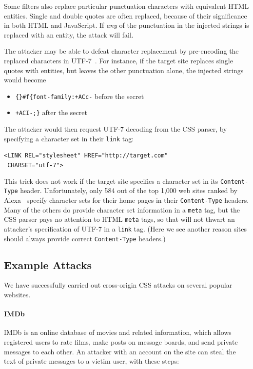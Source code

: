 \documentclass{acm_proc_article-sp}
\begin{document}
Some filters also replace particular punctuation characters with
equivalent HTML entities.  Single and double quotes are often
replaced, because of their significance in both HTML and JavaScript.
If \emph{any} of the punctuation in the injected strings is replaced
with an entity, the attack will fail.

The attacker may be able to defeat character replacement by
pre-encoding the replaced characters in UTF-7~\cite{utf7}.  For
instance, if the target site replaces single quotes with entities, but
leaves the other punctuation alone, the injected strings would become
\begin{itemize}
\item \verb|{}#f{font-family:+ACc-| before the secret
\item \verb|+ACI-;}| after the secret
\end{itemize}
The attacker would then request UTF-7 decoding from the CSS parser,
by specifying a character set in their \verb|link| tag:

\verb|<LINK REL="stylesheet" HREF="http://target.com"|\\
\verb| CHARSET="utf-7">|

This trick does not work if the target site specifies a character set
in its \texttt{Content-Type} header.  Unfortunately, only 584 out of
the top 1,000 web sites ranked by Alexa~\cite{alexa} specify character
sets for their home pages in their \texttt{Content-Type} headers.
Many of the others do provide character set information in a
\verb|meta| tag, but the CSS parser pays no attention to HTML
\verb|meta| tags, so that will not thwart an attacker's specification
of UTF-7 in a \verb|link| tag.  (Here we see another reason sites
should always provide correct \texttt{Content-Type} headers.)


\subsection{Example Attacks} \label{sec:demos}
We have successfully carried out cross-origin CSS attacks on several
popular websites.

\paragraph{IMDb}
IMDb is an online database of movies and related information, which
allows registered users to rate films, make posts on message boards,
and send private messages to each other.  An attacker with an account
on the site can steal the text of private messages to a victim user,
with these steps:
\end{document}
